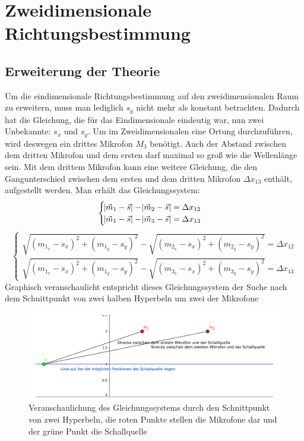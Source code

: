 \section{Zweidimensionale Richtungsbestimmung} 
\subsection{Erweiterung der Theorie}
Um die eindimensionale Richtungsbestimmung auf den zweidimensionalen Raum zu erweitern, muss man lediglich $s_y$ nicht mehr als konstant betrachten. Dadurch hat die Gleichung, die für das Eindimensionale eindeutig war, nun zwei Unbekannte: $s_x$ und $s_y$. Um im Zweidimensionalen eine Ortung durchzuführen, wird deswegen ein drittes Mikrofon $M_3$ benötigt. Auch der Abstand zwischen dem dritten Mikrofon und dem ersten darf maximal so groß wie die Wellenlänge sein. Mit dem drittem Mikrofon kann eine weitere Gleichung, die den Gangunterschied zwischen dem ersten und dem dritten Mikrofon $\Delta{x_{13}}$ enthält, aufgestellt werden. Man erhält das Gleichungssystem:
$$\begin{cases}
  \abs{\vec{m}_1 - \vec{s}} - \abs{\vec{m}_2 - \vec{s}} = \Delta{x_{12}} \\
  \abs{\vec{m}_1 - \vec{s}} - \abs{\vec{m}_3 - \vec{s}} = \Delta{x_{13}}
\end{cases}$$
$$\begin{cases}
  \sqrt{{(m_{1_x} - s_x)}^2 + {(m_{1_y} - s_y)}^2} - \sqrt{{(m_{2_x} - s_x)}^2 + {(m_{2_y} - s_y)}^2} = \Delta{x_{12}} \\
  \sqrt{{(m_{1_x} - s_x)}^2 + {(m_{1_y} - s_y)}^2} - \sqrt{{(m_{3_x} - s_x)}^2 + {(m_{3_y} - s_y)}^2} = \Delta{x_{13}}
\end{cases}$$
Graphisch veranschaulicht entspricht dieses Gleichungssystem der Suche nach dem Schnittpunkt von zwei halben Hyperbeln um zwei der Mikrofone
\begin{figure}[H]
  \includegraphics[width=\linewidth]{img/skizze1d}
  \caption{Veranschaulichung des Gleichungssystems durch den Schnittpunkt von zwei Hyperbeln, die roten Punkte stellen die Mikrofone dar und der grüne Punkt die Schallquelle}
\end{figure}

